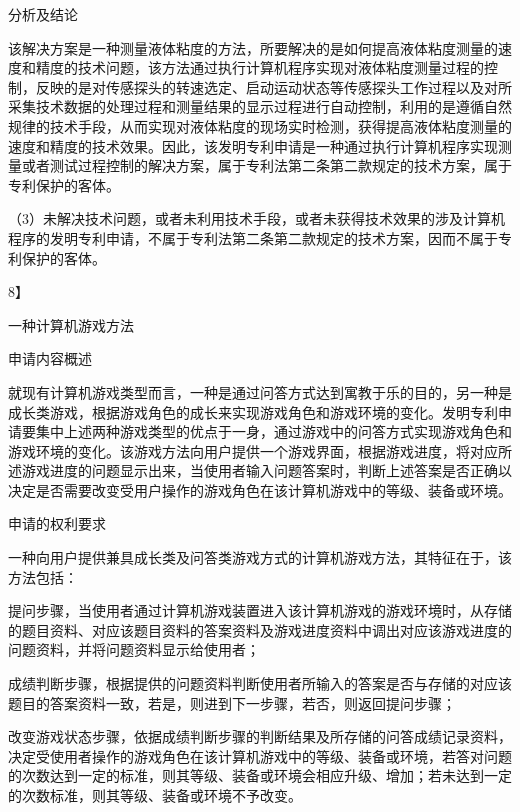 {\setlength{\parindent}{22.5bp}分析及结论\par}

该解决方案是一种测量液体粘度的方法，所要解决的是如何提高液体粘度测量的速度和精度的技术问题，该方法通过执行计算机程序实现对液体粘度测量过程的控制，反映的是对传感探头的转速选定、启动运动状态等传感探头工作过程以及对所采集技术数据的处理过程和测量结果的显示过程进行自动控制，利用的是遵循自然规律的技术手段，从而实现对液体粘度的现场实时检测，获得提高液体粘度测量的速度和精度的技术效果。因此，该发明专利申请是一种通过执行计算机程序实现测量或者测试过程控制的解决方案，属于专利法第二条第二款规定的技术方案，属于专利保护的客体。

{\setlength{\parindent}{17.1bp}（3）未解决技术问题，或者未利用技术手段，或者未获得技术效果的涉及计算机程序的发明专利申请，不属于专利法第二条第二款规定的技术方案，因而不属于专利保护的客体。\par}

{8】\par}

一种计算机游戏方法

{\setlength{\parindent}{22.5bp}申请内容概述\par}

就现有计算机游戏类型而言，一种是通过问答方式达到寓教于乐的目的，另一种是成长类游戏，根据游戏角色的成长来实现游戏角色和游戏环境的变化。发明专利申请要集中上述两种游戏类型的优点于一身，通过游戏中的问答方式实现游戏角色和游戏环境的变化。该游戏方法向用户提供一个游戏界面，根据游戏进度，将对应所述游戏进度的问题显示出来，当使用者输入问题答案时，判断上述答案是否正确以决定是否需要改变受用户操作的游戏角色在该计算机游戏中的等级、装备或环境。

{\setlength{\parindent}{22.5bp}申请的权利要求\par}

一种向用户提供兼具成长类及问答类游戏方式的计算机游戏方法，其特征在于，该方法包括：

提问步骤，当使用者通过计算机游戏装置进入该计算机游戏的游戏环境时，从存储的题目资料、对应该题目资料的答案资料及游戏进度资料中调出对应该游戏进度的问题资料，并将问题资料显示给使用者；

成绩判断步骤，根据提供的问题资料判断使用者所输入的答案是否与存储的对应该题目的答案资料一致，若是，则进到下一步骤，若否，则返回提问步骤；

改变游戏状态步骤，依据成绩判断步骤的判断结果及所存储的问答成绩记录资料，决定受使用者操作的游戏角色在该计算机游戏中的等级、装备或环境，若答对问题的次数达到一定的标准，则其等级、装备或环境会相应升级、增加；若未达到一定的次数标准，则其等级、装备或环境不予改变。

